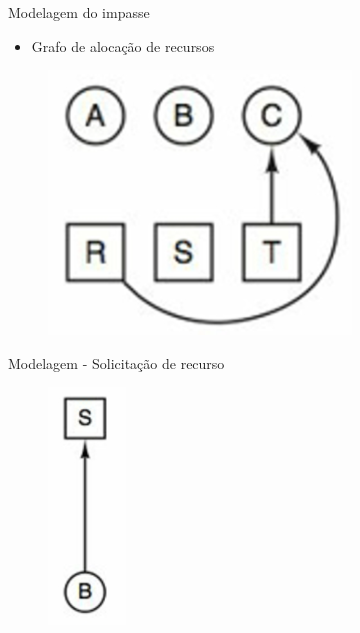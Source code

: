 \documentclass[aspectratio=169,
				xcolor=table]{beamer}
\begin{document}
	\begin{frame}{Modelagem do impasse}
		\begin{itemize}
			\item Grafo de alocação de recursos
		\end{itemize}
		\vspace{2.5em}
		\begin{figure}
			\centering
			\includegraphics[keepaspectratio, height=0.5\paperheight]{../figs/cap07/grafo01.png}			
		\end{figure}
	\end{frame}
	
	\begin{frame}{Modelagem - Solicitação de recurso}
		
		\begin{figure}
			\centering
			\includegraphics[keepaspectratio, height=0.5\paperheight]{../figs/cap07/solicitacao.png}			
		\end{figure}
	\end{frame}
	
\end{document}
